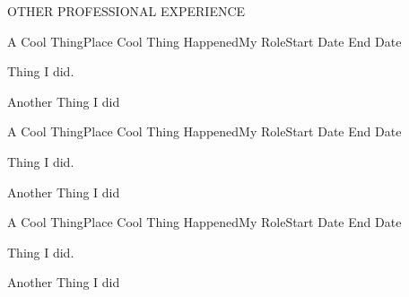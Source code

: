 \documentclass{resume} %
\begin{document}
\begin{rSection}{OTHER PROFESSIONAL EXPERIENCE }

\begin{rSubsection}{A Cool Thing}{Place Cool Thing Happened}{My Role}{Start Date {\textendash} End Date}
\item Thing I did.
\item Another Thing I did
\end{rSubsection}

\begin{rSubsection}{A Cool Thing}{Place Cool Thing Happened}{My Role}{Start Date {\textendash} End Date}
\item Thing I did.
\item Another Thing I did
\end{rSubsection}


\begin{rSubsection}{A Cool Thing}{Place Cool Thing Happened}{My Role}{Start Date {\textendash} End Date}
\item Thing I did.
\item Another Thing I did
\end{rSubsection}

\end{rSection}
\end{document}
